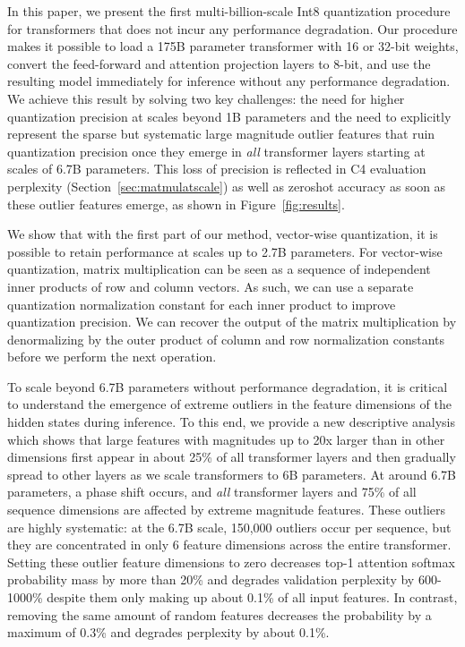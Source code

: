 In this paper, we present the first multi-billion-scale Int8 quantization procedure for transformers that does not incur any performance degradation. Our procedure makes it possible to load a 175B parameter transformer with 16 or 32-bit weights, convert the feed-forward and attention projection layers to 8-bit, and use the resulting model immediately for inference without any performance degradation. We achieve this result by solving two key challenges: the need for higher quantization precision at scales beyond 1B parameters and the need to explicitly represent the sparse but systematic large magnitude outlier features that ruin quantization precision once they emerge in {\it all} transformer layers starting at scales of 6.7B parameters. This loss of precision is reflected in C4 evaluation perplexity (Section~\ref{sec:matmulatscale}) as well as zeroshot accuracy as soon as these outlier features emerge, as shown in Figure~\ref{fig:results}.

We show that with the first part of our method, vector-wise quantization, it is possible to retain performance at scales up to 2.7B parameters. For vector-wise quantization,  matrix multiplication can be seen as a sequence of independent inner products of row and column vectors. As such, we can use a separate quantization normalization constant for each inner product to improve quantization precision. We can recover the output of the matrix multiplication by denormalizing by the outer product of column and row normalization constants before we perform the next operation. 

To scale beyond 6.7B parameters without performance degradation, it is critical to understand the emergence of extreme outliers in the feature dimensions of the hidden states during inference. To this end, we provide a new descriptive analysis which shows that large features with magnitudes up to 20x larger than in other dimensions first appear in about 25\% of all transformer layers and then gradually spread to other layers as we scale transformers to 6B parameters. At around 6.7B parameters, a phase shift occurs, and {\it all} transformer layers and 75\% of all sequence dimensions are affected by extreme magnitude features. These outliers are highly systematic: at the 6.7B scale, 150,000 outliers occur per sequence, but they are concentrated in only 6 feature dimensions across the entire transformer. Setting these outlier feature dimensions to zero decreases top-1 attention softmax probability mass by more than 20\% and degrades validation perplexity by 600-1000\% despite them only making up about 0.1\% of all input features. In contrast, removing the same amount of random features decreases the probability by a maximum of 0.3\% and degrades perplexity by about 0.1\%.


